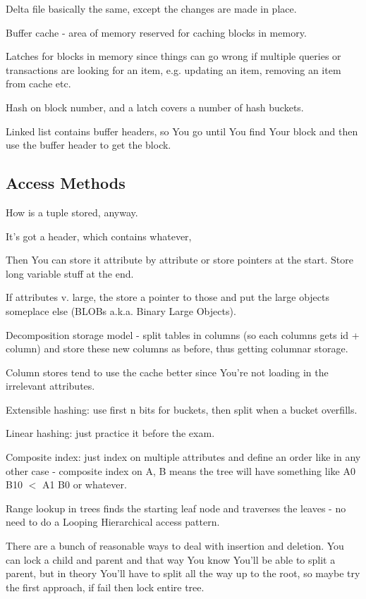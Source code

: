 \documentclass{article}
\begin{document}
		Delta file basically the same, except the changes are made in place.
		
		Buffer cache - area of memory reserved for caching blocks in memory.
		
		Latches for blocks in memory since things can go wrong if multiple queries or transactions are looking for an item, e.g. updating an item, removing an item from cache etc.
		
		Hash on block number, and a latch covers a number of hash buckets.
		
		Linked list contains buffer headers, so You go until You find Your block and then use the buffer header to get the block.
		
	\subsection{Access Methods}
	
		How is a tuple stored, anyway.
		
		It's got a header, which contains whatever, 
		
		Then You can store it attribute by attribute or store pointers at the start. Store long variable stuff at the end.
		
		If attributes v. large, the store a pointer to those and put the large objects someplace else (BLOBs a.k.a. Binary Large Objects).
		
		Decomposition storage model - split tables in columns (so each columns gets id + column) and store these new columns as before, thus getting columnar storage.
		
		Column stores tend to use the cache better since You're not loading in the irrelevant attributes.
		
		Extensible hashing: use first n bits for buckets, then split when a bucket overfills.
		
		Linear hashing: just practice it before the exam.
		
		Composite index: just index on multiple attributes and define an order like in any other case - composite index on A, B means the tree will have something like A0 B10 $<$ A1 B0 or whatever.
		
		Range lookup in trees finds the starting leaf node and traverses the leaves - no need to do a Looping Hierarchical access pattern.
		
		There are a bunch of reasonable ways to deal with insertion and deletion. You can lock a child and parent and that way You know You'll be able to split a parent, but in theory You'll have to split all the way up to the root, so maybe try the first approach, if fail then lock entire tree.
		
\end{document}
